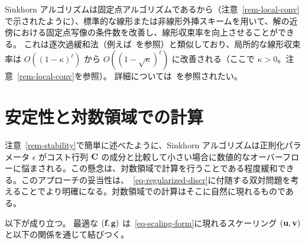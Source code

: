 \begin{rem}[外挿加速]
	Sinkhorn アルゴリズムは固定点アルゴリズムであるから（注意~\ref{rem-local-conv}で示されたように）、標準的な線形または非線形外挿スキームを用いて、解の近傍における固定点写像の条件数を改善し、線形収束率を向上させることができる。
	これは逐次過緩和法（例えば~\citep{hadjidimos2000successive}を参照）と類似しており、局所的な線形収束率は $O((1-\kappa)^\ell)$ から $O((1-\sqrt{\kappa})^\ell)$ に改善される（ここで $\kappa>0$。注意~\ref{rem-local-conv}を参照）。
	詳細については~\citep{2016-peyre-qot}を参照されたい。
\end{rem}



\section{安定性と対数領域での計算}

注意~\ref{rem-stability}で簡単に述べたように、Sinkhorn アルゴリズムは正則化パラメータ $\epsilon$ がコスト行列 $\mathrm{\textbf{C}}$ の成分と比較して小さい場合に数値的なオーバーフローに悩まされる。この懸念は、対数領域で計算を行うことである程度緩和できる。このアプローチの妥当性は、~\eqref{eq-regularized-discr}に付随する双対問題を考えることでより明確になる。対数領域での計算はそこに自然に現れるものである。

\begin{prop}
以下が成り立つ。
最適な $(\mathrm{\textbf{f}},\mathrm{\textbf{g}})$ は~\eqref{eq-scaling-form}に現れるスケーリング $(\mathrm{\textbf{u}},\mathrm{\textbf{v}})$ と以下の関係を通じて結びつく。
\end{prop}

